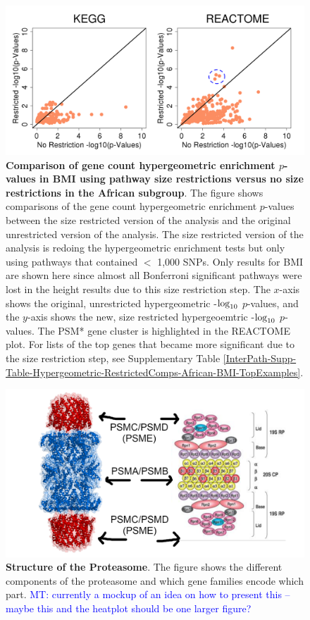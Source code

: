 \documentclass[12pt,a4paper]{article}
\def\log{{\rm log}}
\begin{document}
\begin{figure}[htbp]
\centering
\includegraphics[scale=.4]{Images/Main/InterPath_Main_Figure_Hypergeometric_RestrictedComps_African_BMI_vs2.png}
\caption[TBD]{\textbf{Comparison of gene count hypergeometric enrichment $p$-values in BMI using pathway size restrictions versus no size restrictions in the African subgroup}. The figure shows comparisons of the gene count hypergeometric enrichment $p$-values between the size restricted version of the analysis and the original unrestricted version of the analysis. The size restricted version of the analysis is redoing the hypergeometric enrichment tests but only using pathways that contained $<$ 1,000 SNPs. Only results for BMI are shown here since almost all Bonferroni significant pathways were lost in the height results due to this size restriction step. The $x$-axis shows the original, unrestricted hypergeometric -$\log_{10}$ $p$-values, and the $y$-axis shows the new, size restricted hypergeoemtric -$\log_{10}$ $p$-values. The PSM* gene cluster is highlighted in the REACTOME plot. For lists of the top genes that became more significant due to the size restriction step, see Supplementary Table \ref{InterPath-Supp-Table-Hypergeometric-RestrictedComps-African-BMI-TopExamples}.}
\label{InterPath-Main-Figure-Hypergeometric-RestrictedComps-African-BMI}
\end{figure}
\clearpage

\begin{figure}[htb]
\centering
\includegraphics[scale=.2]{Images/Main/MockUp1.png}
\caption[TBD]{\textbf{Structure of the Proteasome}. The figure shows the different components of the proteasome and which gene families encode which part. \textcolor{blue}{MT: currently a mockup of an idea on how to present this -- maybe this and the heatplot should be one larger figure? }
}
\label{InterPath-Main-Figure-Proteasome-Schematic}
\end{figure}
\end{document}
